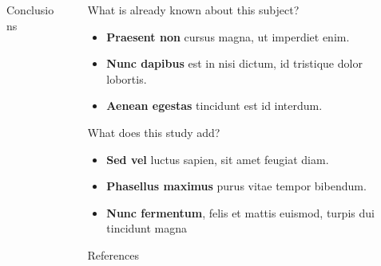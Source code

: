 \documentclass[final]{beamer}
\newlength{\sepwidth}
\newlength{\colwidth}
\newcommand{\separatorcolumn}{\begin{column}{\sepwidth}\end{column}}
\begin{document}
\begin{frame}[t]
\begin{columns}[t]
\begin{column}{\colwidth}
\begin{block}{Conclusions}
  \end{block}

\end{column}

\separatorcolumn

\begin{column}{\colwidth}

  \begin{exampleblock}{What is already known about this subject?}

    \begin{itemize}
      \item \textbf{Praesent non} cursus magna, ut imperdiet enim. 
      \item \textbf{Nunc dapibus} est in nisi dictum, id tristique dolor lobortis.
      \item \textbf{Aenean egestas} tincidunt est id interdum. 
    \end{itemize}

  \end{exampleblock}

  \begin{exampleblock}{What does this study add?}
    \begin{itemize}
      \item \textbf{Sed vel} luctus sapien, sit amet feugiat diam.
      \item \textbf{Phasellus maximus} purus vitae tempor bibendum. 
      \item \textbf{Nunc fermentum}, felis et mattis euismod, turpis dui tincidunt magna
    \end{itemize}

  \end{exampleblock}

  \begin{block}{References}

    \footnotesize{}

  \end{block}

\end{column}

\separatorcolumn
\end{columns}
\end{frame}
\end{document}
